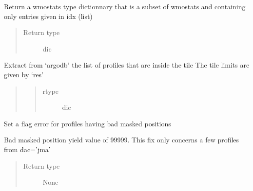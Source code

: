 \documentclass[letterpaper,10pt,english]{sphinxmanual}
\begin{document}

\begin{fulllineitems}
\label{\detokenize{pargopy:pargopy.argotools.extract_idx_from_wmostats}}
Return a wmostats type dictionnary that is a subset of wmostats and
containing only entries given in idx (list)
\begin{quote}\begin{description}
\item[{Return type}] \leavevmode
dic

\end{description}\end{quote}

\end{fulllineitems}


\begin{fulllineitems}
\label{\detokenize{pargopy:pargopy.argotools.extract_idx_inside_tile}}
Extract from ‘argodb’ the list of profiles that are inside the tile
The tile limits are given by ‘res’
\begin{quote}
\begin{quote}\begin{description}
\item[{rtype}] \leavevmode
dic

\end{description}\end{quote}
\end{quote}

\end{fulllineitems}


\begin{fulllineitems}
\label{\detokenize{pargopy:pargopy.argotools.fix_flag_latlonf}}
Set a flag error for profiles having bad masked positions

Bad masked position yield value of 99999. This fix only concerns a
few profiles from dac=’jma’
\begin{quote}\begin{description}
\item[{Return type}] \leavevmode
None

\end{description}\end{quote}

\end{fulllineitems}
\end{document}
